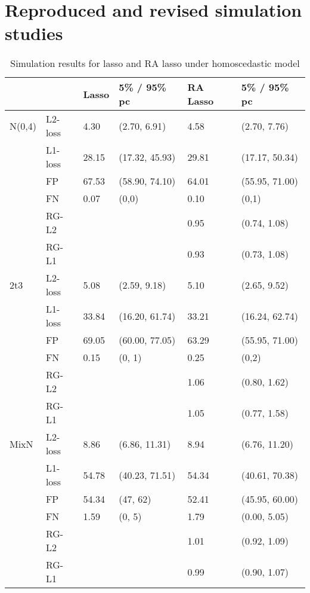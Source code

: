 

\section{Reproduced and revised simulation studies}\label{sec:newsimulation}
\begin{table}[]
\centering
\begin{tabular}{llllll}
       &         & Lasso    & 5\% / 95\% pc & RA Lasso  & 5\% / 95\% pc \\ \hline
N(0,4) & L2-loss & 4.30 & (2.70, 6.91)     & 4.58  & (2.70, 7.76)     \\
       & L1-loss & 28.15 & (17.32, 45.93)     & 29.81  & (17.17, 50.34)     \\
       & FP      & 67.53    & (58.90, 74.10)             & 64.01     & (55.95, 71.00)           \\
       & FN      & 0.07     & (0,0)                    & 0.10       & (0,1)                    \\
       & RG-L2   &          &                          & 0.95  & (0.74, 1.08)   \\
       & RG-L1   &          &                          & 0.93  & (0.73, 1.08)   \\ \hline
2t3    & L2-loss & 5.08 & (2.59, 9.18)     & 5.10  & (2.65, 9.52)     \\
       & L1-loss & 33.84 & (16.20, 61.74)     & 33.21  & (16.24, 62.74)     \\
       & FP      & 69.05    & (60.00, 77.05)              & 63.29     & (55.95, 71.00)           \\
       & FN      & 0.15     & (0, 1)                   & 0.25      & (0,2)                    \\
       & RG-L2   &          &                          & 1.06 & (0.80, 1.62)   \\
       & RG-L1   &          &                          & 1.05  & (0.77, 1.58)     \\ \hline
MixN   & L2-loss & 8.86 & (6.86, 11.31)    & 8.94  & (6.76, 11.20)    \\
       & L1-loss & 54.78 & (40.23, 71.51)     & 54.34  & (40.61, 70.38)     \\
       & FP      & 54.34    & (47, 62)                 & 52.41     & (45.95, 60.00)           \\
       & FN      & 1.59     & (0, 5)                   & 1.79      & (0.00, 5.05)             \\
       & RG-L2   &          &                          & 1.01 & (0.92, 1.09)   \\
       & RG-L1   &          &                          & 0.99  & (0.90, 1.07)  
\end{tabular}
\caption{Simulation results for lasso and RA lasso under homoscedastic model}\label{tab:reproduce}
\end{table}
